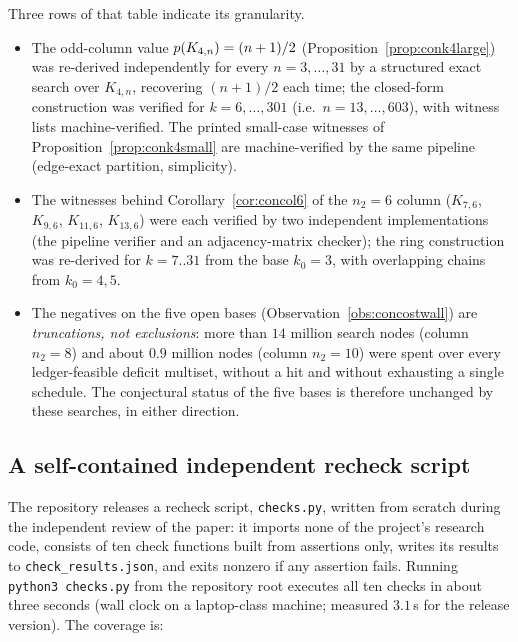 Three rows of that table indicate its granularity.

\begin{itemize}[leftmargin=1.8em]
\item The odd-column value $p(K_{4,n})=(n+1)/2$
(Proposition~\ref{prop:conk4large}) was re-derived independently for every
$n=3,\dots,31$ by a structured exact search over $K_{4,n}$, recovering
$(n+1)/2$ each time; the closed-form construction was verified for
$k=6,\dots,301$ (i.e.\ $n=13,\dots,603$), with witness lists
machine-verified. The printed small-case witnesses of
Proposition~\ref{prop:conk4small} are machine-verified by the same pipeline
(edge-exact partition, simplicity).
\item The witnesses behind Corollary~\ref{cor:concol6} of the $n_2=6$ column
($K_{7,6}$, $K_{9,6}$, $K_{11,6}$, $K_{13,6}$) were each verified by two
independent implementations (the pipeline verifier and an adjacency-matrix
checker); the ring construction was re-derived for $k=7..31$ from the base
$k_0=3$, with overlapping chains from $k_0=4,5$.
\item The negatives on the five open bases
(Observation~\ref{obs:concostwall}) are \emph{truncations, not exclusions}:
more than $14$ million search nodes (column $n_2=8$) and about $0.9$ million
nodes (column $n_2=10$) were spent over every ledger-feasible deficit
multiset, without a hit and without exhausting a single schedule. The
conjectural status of the five bases is therefore unchanged by these
searches, in either direction.
\end{itemize}

\subsection{A self-contained independent recheck script}\label{com:subsec-recheck}

The repository releases a recheck script, \texttt{checks.py}, written from
scratch during the independent review of the paper: it imports none of the
project's research code, consists of ten check functions built from
assertions only, writes its results to \texttt{check\_results.json}, and
exits nonzero if any assertion fails. Running
\texttt{python3 checks.py} from the repository root executes all ten checks
in about three seconds (wall clock on a laptop-class machine; measured
$3.1$\,s for the release version). The coverage is:

